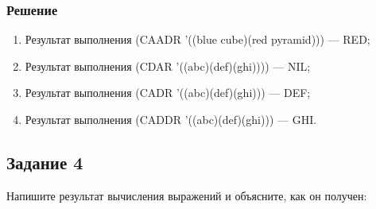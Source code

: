 \documentclass[a4paper,oneside,14pt]{extarticle}
\begin{document}
\subsubsection*{Решение}

\begin{enumerate}
    \item Результат выполнения (CAADR '((blue cube)(red pyramid))) --- RED;
    \item Результат выполнения (CDAR '((abc)(def)(ghi)))) --- NIL;
    \item Результат выполнения (CADR '((abc)(def)(ghi))) --- DEF;
    \item Результат выполнения (CADDR '((abc)(def)(ghi))) --- GHI.
\end{enumerate}

\newpage
\subsection{Задание 4}

Напишите результат вычисления выражений и объясните, как он получен:
\end{document}

